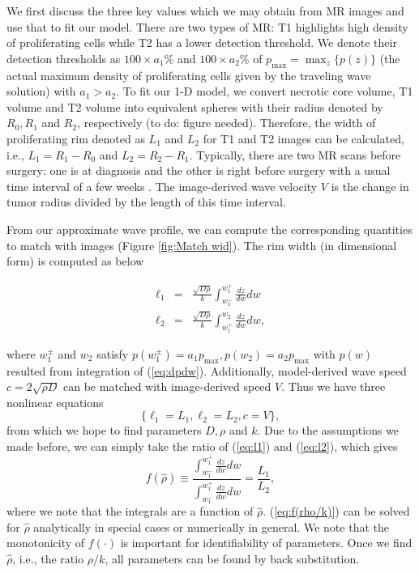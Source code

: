 \documentclass{aims}
\numberwithin{equation}{section}
\begin{document}
We first discuss the three key values which we may obtain
from MR images and use that to fit our model. There are two types of MR: T1
highlights high density of proliferating cells while T2 has a lower
detection threshold. We denote their detection thresholds as $100\times a_{1}\%$
and $100\times a_{2}\%$ of $p_{\max}=\max_{z}\{p(z)\}$ (the actual
maximum density of proliferating cells given by the traveling wave
solution) with $a_{1}>a_{2}$. To fit our 1-D model, we convert necrotic
core volume, T1 volume and T2 volume into equivalent spheres with
their radius denoted by $R_{0},R_{1}$ and $R_{2}$, respectively (to do: figure
needed). Therefore, the width of proliferating rim denoted as $L_{1}$
and $L_{2}$ for T1 and T2 images can be calculated, i.e., $L_{1}=R_{1}-R_{0}$
and $L_{2}=R_{2}-R_{1}$. Typically, there are two MR scans before
surgery: one is at diagnosis and the other is right before surgery
with a usual time interval of a few weeks \cite{Swanson2008}. The
image-derived wave velocity $V$ is the change in tumor radius divided
by the length of this time interval. 

From our approximate wave profile, we can compute the corresponding
quantities to match with images (Figure \ref{fig:Match wid}). The
rim width (in dimensional form) is computed as below

\begin{subequations}
\begin{eqnarray}
\ell_{1} & = & \frac{\sqrt{D\rho}}{k}\int_{w_{1}^{-}}^{w_{1}^{+}}\frac{dz}{dw}dw\label{eq:l1}\\
\ell_{2} & = & \frac{\sqrt{D\rho}}{k}\int_{w_{1}^{+}}^{w_{2}}\frac{dz}{dw}dw,\label{eq:l2}
\end{eqnarray}
\end{subequations}

where $w_{1}^{\pm}$ and $w_{2}$ satisfy $p(w_{1}^{\pm})=a_{1}p_{\text{max}},p(w_{2})=a_{2}p_{\max}$ with $p(w)$ resulted from integration of (\ref{eq:dpdw}). Additionally, model-derived wave
speed $c=2\sqrt{\rho D}$ can be matched with image-derived speed
$V$. Thus we have three nonlinear equations 
\begin{equation}
\{\ell_{1}=L_{1},\ell_{2}=L_{2},c=V\},\label{eq:l1l2c}
\end{equation}
 from which we hope to find parameters $D,\rho$ and $k$. Due
to the assumptions we made before, we can simply take the ratio of
(\ref{eq:l1}) and (\ref{eq:l2}), which gives 
\begin{equation}
f(\hat{\rho})\equiv\frac{\int_{w_{1}^{-}}^{w_{1}^{+}}\frac{dz}{dw}dw}{\int_{w_{1}^{-}}^{w_{1}^{+}}\frac{dz}{dw}dw}=\frac{L_{1}}{L_{2}},\label{eq:f(rho/k)}
\end{equation}
where we note that the integrals are a function of $\hat{\rho}$. (\ref{eq:f(rho/k)})
can be solved for $\hat{\rho}$ analytically in special cases or numerically
in general. We note that the monotonicity of $f(\cdot)$ is important
for identifiability of parameters. Once we find $\hat{\rho}$, i.e., the ratio $\rho /k$, all parameters can be found by back substitution. 
\end{document}
